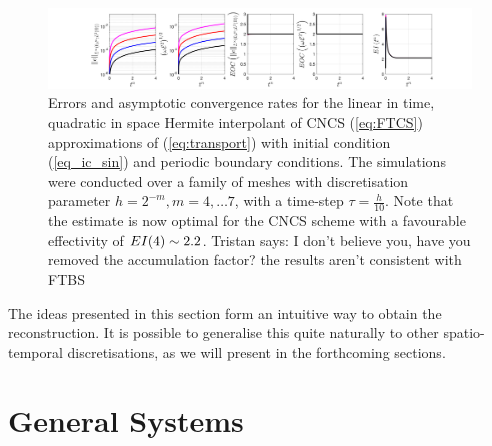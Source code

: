 \documentclass[final]{amsart}
\newcommand{\tristan}[1]{{\color{purple} Tristan says:  #1 }}
\numberwithin{equation}{section}
\begin{document}
\begin{figure}[H] 
	\includegraphics[width=\textwidth]{../figures/fig_CNCS_plots_1x5_sin_IC_ind_uniform_P2}	
	\caption{
		\label{fig:FTCS_prelim_P2}
		Errors and asymptotic convergence rates for the linear
                in time, quadratic in space Hermite interpolant of
                CNCS (\ref{eq:FTCS}) approximations of
                (\ref{eq:transport}) with initial condition
                (\ref{eq_ic_sin}) and periodic boundary
                conditions. The simulations were conducted over a
                family of meshes with discretisation parameter $h =
                2^{-m}, m = 4,\dots 7$, with a time-step $\tau =
                \tfrac{h}{10}$. Note that the estimate is now optimal
                for the CNCS scheme with a favourable effectivity of
                $EI \!\left({4}\right) \sim 2.2$. \tristan{I don't believe you,
                  have you removed the accumulation factor? the
                  results aren't consistent with FTBS}}
\end{figure}

The ideas presented in this section form an intuitive way to obtain
the reconstruction. It is possible to generalise this quite naturally
to other spatio-temporal discretisations, as we will present in the
forthcoming sections.

\section{General Systems}\label{sec:numerical_discretisation}

\end{document}
